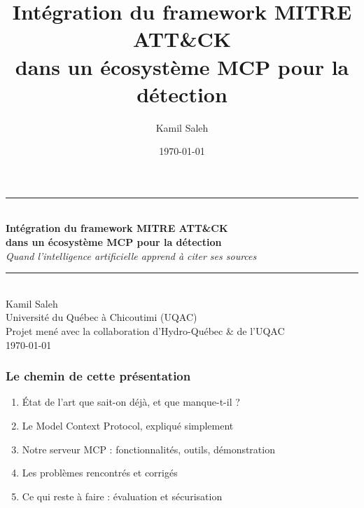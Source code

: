 \documentclass[aspectratio=169,11pt]{beamer}
\title{Intégration du framework MITRE ATT\&CK\\ dans un écosystème MCP pour la détection}
\author{Kamil Saleh}
\date{\today}
\begin{document}


\begin{frame}[plain]
  \begin{center}
    \vspace{0.9cm}
    {\color{colAccent}\rule{0.55\textwidth}{1.2pt}}\\[0.55cm]
    {\LARGE\bfseries\color{colTitre}
      Intégration du framework MITRE ATT\&CK\\[0.15cm]
      dans un écosystème MCP pour la détection}\\[0.35cm]
    {\large\itshape\color{colGris}
      Quand l'intelligence artificielle apprend à citer ses sources}\\[0.5cm]
    {\color{colAccent}\rule{0.55\textwidth}{1.2pt}}\\[0.7cm]
    {\normalsize\color{colGris} Kamil Saleh}\\[0.12cm]
    {\small\color{colGris} Université du Québec à Chicoutimi (UQAC)}\\[0.06cm]
    {\small\color{colGris} Projet mené avec la collaboration d'Hydro-Québec & de l'UQAC }\\[0.45cm]
    {\small\color{colGris}\today}
  \end{center}
\end{frame}


\begin{frame}
  \frametitle{Le chemin de cette présentation}
  \vspace{0.25cm}
  \begin{enumerate}\setlength\itemsep{0.6em}
    \item {\color{colAccent} État de l'art} que sait-on déjà, et que
      manque-t-il ?
    \item Le Model Context Protocol, expliqué simplement
    \item Notre serveur MCP : fonctionnalités, outils, démonstration
    \item Les problèmes rencontrés et corrigés
    \item Ce qui reste à faire : évaluation et sécurisation
  \end{enumerate}
\end{frame}
 
\end{document}
